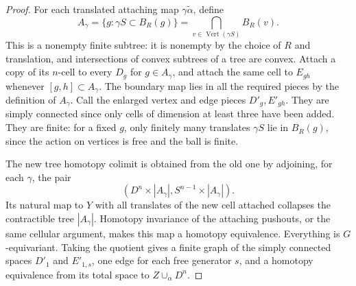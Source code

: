 \begin{proof}
For each translated attaching map $\gamma\widetilde\alpha$, define
\[
 A_\gamma=\{g:\gamma S\subset B_R(g)\}
          =\bigcap_{v\in\operatorname{Vert}(\gamma S)}B_R(v).
\]
This is a nonempty finite subtree: it is nonempty by the choice of $R$
and translation, and intersections of convex subtrees of a tree are
convex. Attach a copy of its $n$-cell to every $D_g$ for $g\in A_\gamma$,
and attach the same cell to $E_{gh}$ whenever $[g,h]\subset A_\gamma$.
The boundary map lies in all the required pieces by the definition of
$A_\gamma$. Call the enlarged vertex and edge pieces $D'_g,E'_{gh}$.
They are simply connected since only cells of dimension at least three
have been added. They are finite: for a fixed $g$, only finitely many
translates $\gamma S$ lie in $B_R(g)$, since the action on vertices is
free and the ball is finite.

The new tree homotopy colimit is obtained from the old one by adjoining,
for each $\gamma$, the pair
\[
 (D^n\times |A_\gamma|,
  S^{n-1}\times |A_\gamma|).
\]
Its natural map to $Y$ with all translates of the new cell attached
collapses the contractible tree $|A_\gamma|$. Homotopy invariance of the
attaching pushouts, or the same cellular argument, makes this map a
homotopy equivalence. Everything is $G$-equivariant. Taking the quotient
gives a finite graph of the simply connected spaces $D'_1$ and
$E'_{1,s}$, one edge for each free generator $s$, and a homotopy
equivalence from its total space to $Z\cup_\alpha D^n$.
\end{proof}

